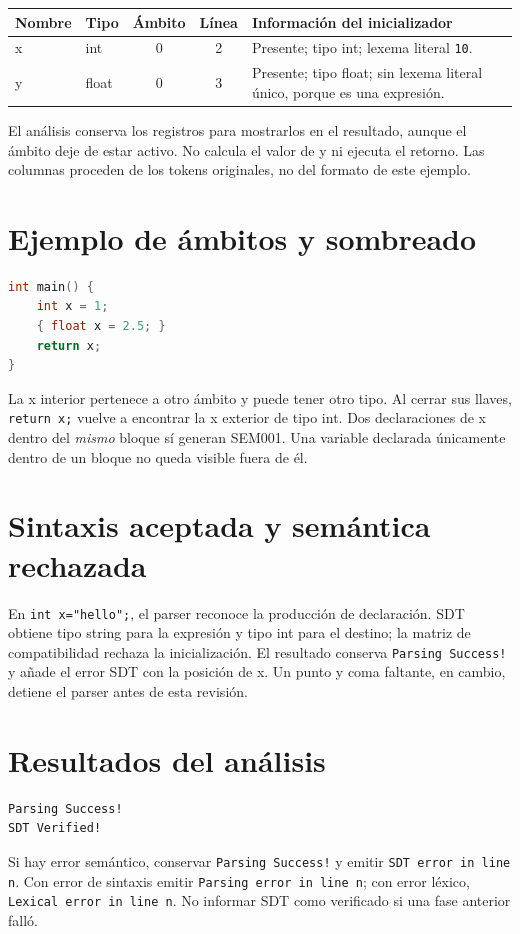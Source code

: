 \begin{tabularx}{\linewidth}{@{}l l c c X@{}}\toprule Nombre & Tipo & Ámbito & Línea & Información del inicializador\\\midrule
x & int & 0 & 2 & Presente; tipo int; lexema literal \texttt{10}.\\
y & float & 0 & 3 & Presente; tipo float; sin lexema literal único, porque es una expresión.\\\bottomrule\end{tabularx}

El análisis conserva los registros para mostrarlos en el resultado, aunque el ámbito deje de estar activo. No calcula el valor de y ni ejecuta el retorno. Las columnas proceden de los tokens originales, no del formato de este ejemplo.
\clearpage\section*{Ejemplo de ámbitos y sombreado}
\begin{lstlisting}[language=C]
int main() {
    int x = 1;
    { float x = 2.5; }
    return x;
}
\end{lstlisting}
La x interior pertenece a otro ámbito y puede tener otro tipo. Al cerrar sus llaves, \texttt{return x;} vuelve a encontrar la x exterior de tipo int. Dos declaraciones de x dentro del \emph{mismo} bloque sí generan SEM001. Una variable declarada únicamente dentro de un bloque no queda visible fuera de él.
\section*{Sintaxis aceptada y semántica rechazada}
En \texttt{int x="hello";}, el parser reconoce la producción de declaración. SDT obtiene tipo string para la expresión y tipo int para el destino; la matriz de compatibilidad rechaza la inicialización. El resultado conserva \texttt{Parsing Success!} y añade el error SDT con la posición de x. Un punto y coma faltante, en cambio, detiene el parser antes de esta revisión.

\section*{Resultados del análisis}
\begin{lstlisting}
Parsing Success!
SDT Verified!
\end{lstlisting}
Si hay error semántico, conservar \texttt{Parsing Success!} y emitir \texttt{SDT error in line n}. Con error de sintaxis emitir \texttt{Parsing error in line n}; con error léxico, \texttt{Lexical error in line n}. No informar SDT como verificado si una fase anterior falló.



